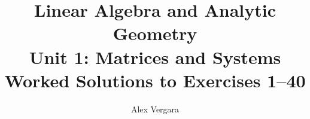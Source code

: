 \documentclass[12pt,twoside,a4paper]{article}
\title{
  \textbf{Linear Algebra and Analytic Geometry}\\[0.35em]
  \large Unit 1: Matrices and Systems\\[0.2em]
  \normalsize Worked Solutions to Exercises 1--40
}
\author{Alex Vergara}
\begin{document}
\maketitle

\begin{enumerate}

\end{enumerate}
\end{document}
